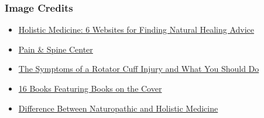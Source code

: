 \documentclass[usenames,dvipsnames]{beamer}
\begin{document}

\begin{frame}
\frametitle{Image Credits}

\begin{itemize}
\item \href{https://www.newsmax.com/fastfeatures/holistic-medicine-websites-advice/2014/10/09/id/597217/} {Holistic Medicine: 6 Websites for Finding Natural Healing Advice}
\item \href{https://www.youngstownortho.com/spine/} {Pain \& Spine Center}
\item
\href{https://www.arksurgicalhospital.com/the-symptoms-of-a-rotator-cuff-injury-and-what-you-should-do-3/}
{The Symptoms of a Rotator Cuff Injury and What You Should Do}
\item \href{https://bookriot.com/books-with-books-on-the-cover/}{16 Books Featuring Books on the Cover}
\item \href{https://www.emrindustry.com/difference-between-naturopathic-and-holistic-medicine/} {Difference Between Naturopathic and Holistic Medicine}
\end{itemize}

\end{frame}
  
\end{document}
